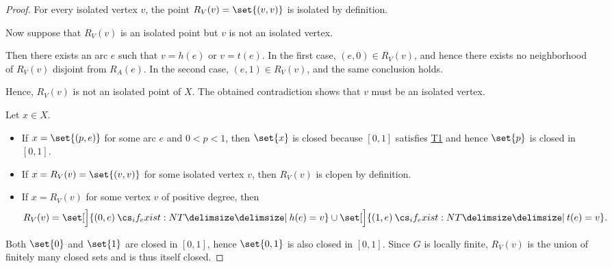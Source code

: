 \begin{proof}

  \SufficiencySubProof* For every isolated vertex \( v \), the point \( R_V(v) = \set{ (v, v) } \) is isolated by definition.

  \NecessitySubProof* Now suppose that \( R_V(v) \) is an isolated point but \( v \) is not an isolated vertex.

  Then there exists an arc \( e \) such that \( v = h(e) \) or \( v = t(e) \). In the first case, \( (e, 0) \in R_V(v) \), and hence there exists no neighborhood of \( R_V(v) \) disjoint from \( R_A(e) \). In the second case, \( (e, 1) \in R_V(v) \), and the same conclusion holds.

  Hence, \( R_V(v) \) is not an isolated point of \( X \). The obtained contradiction shows that \( v \) must be an isolated vertex.

   Let \( x \in X \).

  \begin{itemize}
    \item If \( x = \set{ (p, e) } \) for some arc \( e \) and \( 0 < p < 1 \), then \( \set{ x } \) is closed because \( [0, 1] \) satisfies \hyperref[def:separation_axioms/T1]{T1} and hence \( \set{ p } \) is closed in \( [0, 1] \).

    \item If \( x = R_V(v) = \set{ (v, v) } \) for some isolated vertex \( v \), then \( R_V(v) \) is clopen by definition.

    \item If \( x = R_V(v) \) for some vertex \( v \) of positive degree, then
    \begin{equation*}
      R_V(v) = \set[\Big]{ (0, e) \given* h(e) = v } \cup \set[\Big]{ (1, e) \given* t(e) = v }.
    \end{equation*}
  \end{itemize}

  Both \( \set{ 0 } \) and \( \set{ 1 } \) are closed in \( [0, 1] \), hence \( \set{ 0, 1 } \) is also closed in \( [0, 1] \). Since \( G \) is locally finite, \( R_V(v) \) is the union of finitely many closed sets and is thus itself closed.
\end{proof}

